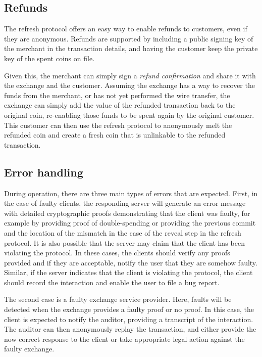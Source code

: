 \documentclass[sigconf, authordraft]{acmart}
\begin{document}
\subsection{Refunds}

The refresh protocol offers an easy way to enable refunds to
customers, even if they are anonymous.  Refunds are supported
by including a public signing key of the merchant in the transaction
details, and having the customer keep the private key of the spent
coins on file.

Given this, the merchant can simply sign a {\em refund confirmation}
and share it with the exchange and the customer.  Assuming the
exchange has a way to recover the funds from the merchant, or has not
yet performed the wire transfer, the exchange can simply add the value
of the refunded transaction back to the original coin, re-enabling
those funds to be spent again by the original customer.  This customer
can then use the refresh protocol to anonymously melt the refunded
coin and create a fresh coin that is unlinkable to the refunded
transaction.


\subsection{Error handling}

During operation, there are three main types of errors that are
expected.  First, in the case of faulty clients, the responding server
will generate an error message with detailed cryptographic proofs
demonstrating that the client was faulty, for example by providing
proof of double-spending or providing the previous commit and the
location of the mismatch in the case of the reveal step in the
refresh protocol.  It is also possible that the server may claim that
the client has been violating the protocol.  In these cases, the
clients should verify any proofs provided and if they are acceptable,
notify the user that they are somehow faulty.  Similar, if the
server indicates that the client is violating the protocol, the
client should record the interaction and enable the user to file a
bug report.

The second case is a faulty exchange service provider.  Here, faults
will be detected when the exchange provides a faulty proof or no
proof.  In this case, the client is expected to notify the auditor,
providing a transcript of the interaction.  The auditor can then
anonymously replay the transaction, and either provide the now correct
response to the client or take appropriate legal action against the
faulty exchange.
\end{document}
